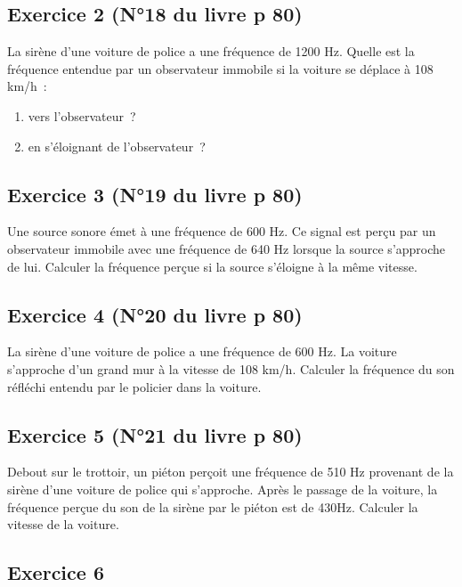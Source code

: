 \subsection{Exercice 2 (N°18 du livre p 80)}

La sirène d'une voiture de police a une fréquence de 1200 Hz. Quelle est
la fréquence entendue par un observateur immobile si la voiture se
déplace à 108 km/h~:
\begin{enumerate}
	\item vers l'observateur~?
	\item en s'éloignant de l'observateur~?
\end{enumerate}

\subsection{Exercice 3 (N°19 du livre p 80)}

Une source sonore émet à une fréquence de 600 Hz. Ce signal est perçu par
un observateur immobile avec une fréquence de 640 Hz lorsque la source
s'approche de lui. Calculer la fréquence perçue si la source s'éloigne à
la même vitesse.

\subsection{Exercice 4 (N°20 du livre p 80)}

La sirène d'une voiture de police a une fréquence de 600 Hz. La voiture
s'approche d'un grand mur à la vitesse de 108 km/h. Calculer la
fréquence du son réfléchi entendu par le policier dans la voiture.

\subsection{Exercice 5 (N°21 du livre p 80)}

Debout sur le trottoir, un piéton perçoit une fréquence de 510 Hz
provenant de la sirène d'une voiture de police qui s'approche. Après le
passage de la voiture, la fréquence perçue du son de la sirène par le
piéton est de 430Hz. Calculer la vitesse de la voiture.

\subsection{Exercice 6 }

